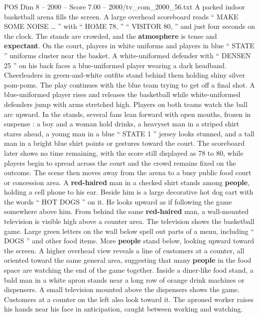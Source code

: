 \begin{textsample}{POS Dim 8 – 2000 – Score 7.00 – 2000/tv\_com\_2000\_56.txt}  \label{ex:f8_pos_013}
A packed indoor basketball arena fills the screen.
A large overhead scoreboard reads “ MAKE SOME NOISE … ” with “ HOME 78, ” “ VISITOR 80, ” and just four seconds on the clock.
The stands are crowded, and the \textbf{atmosphere} is tense and \textbf{expectant}.
On the court, players in white uniforms and players in blue “ STATE ” uniforms cluster near the basket.
A white-uniformed defender with “ DENSEN 25 ” on his back faces a blue-uniformed player wearing a dark headband.
Cheerleaders in green-and-white outfits stand behind them holding shiny silver pom-poms.
The play continues with the blue team trying to get off a final shot.
A blue-uniformed player rises and releases the basketball while white-uniformed defenders jump with arms stretched high.
Players on both teams watch the ball arc upward.
In the stands, several fans lean forward with open mouths, frozen in suspense : a boy and a woman hold drinks, a heavyset man in a striped shirt stares ahead, a young man in a blue “ STATE 1 ” jersey looks stunned, and a tall man in a bright blue shirt points or gestures toward the court.
The scoreboard later shows no time remaining, with the score still displayed as 78 to 80, while players begin to spread across the court and the crowd remains fixed on the outcome.
The scene then moves away from the arena to a busy public food court or concession area.
A \textbf{red-haired} man in a checked shirt stands among \textbf{people}, holding a cell phone to his ear.
Beside him is a large decorative hot dog cart with the words “ HOT DOGS ” on it.
He looks upward as if following the game somewhere above him.
From behind the same \textbf{red-haired} man, a wall-mounted television is visible high above a counter area.
The television shows the basketball game.
Large green letters on the wall below spell out parts of a menu, including “ DOGS ” and other food items.
More \textbf{people} stand below, looking upward toward the screen.
A higher overhead view reveals a line of customers at a counter, all oriented toward the same general area, suggesting that many \textbf{people} in the food space are watching the end of the game together.
Inside a diner-like food stand, a bald man in a white apron stands near a long row of orange drink machines or dispensers.
A small television mounted above the dispensers shows the game.
Customers at a counter on the left also look toward it.
The aproned worker raises his hands near his face in anticipation, caught between working and watching.

\end{textsample}
